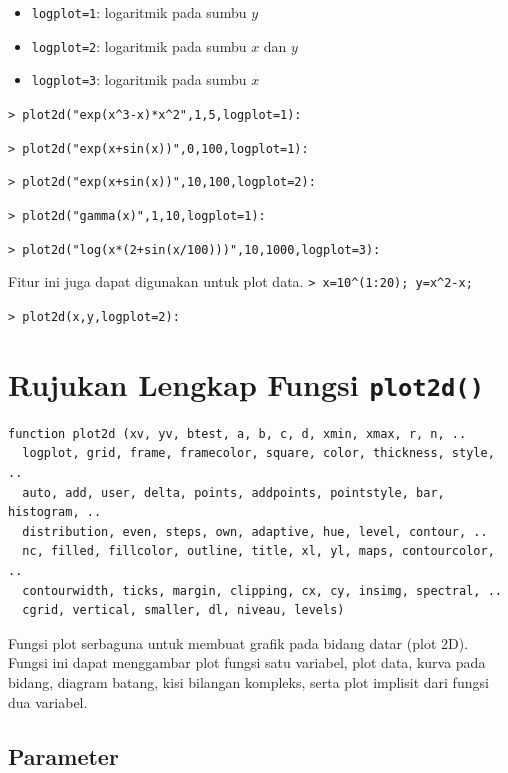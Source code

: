 \documentclass[11pt, a4paper]{article}
\newcommand{\emtcmd}[1]{\noindent\texttt{\textcolor{emtcommand}{>}\ #1}\par\smallskip}
\begin{document}
\begin{itemize}
    \item \texttt{logplot=1}: logaritmik pada sumbu $y$
    \item \texttt{logplot=2}: logaritmik pada sumbu $x$ dan $y$
    \item \texttt{logplot=3}: logaritmik pada sumbu $x$
\end{itemize}

\emtcmd{plot2d("exp(x\^{}3-x)*x\^{}2",1,5,logplot=1):}
\emtcmd{plot2d("exp(x+sin(x))",0,100,logplot=1):}
\emtcmd{plot2d("exp(x+sin(x))",10,100,logplot=2):}
\emtcmd{plot2d("gamma(x)",1,10,logplot=1):}
\emtcmd{plot2d("log(x*(2+sin(x/100)))",10,1000,logplot=3):}

Fitur ini juga dapat digunakan untuk plot data.
\emtcmd{x=10\^{}(1:20); y=x\^{}2-x;}
\emtcmd{plot2d(x,y,logplot=2):}

\section*{Rujukan Lengkap Fungsi \texttt{plot2d()}}

\begin{verbatim}
function plot2d (xv, yv, btest, a, b, c, d, xmin, xmax, r, n, ..
  logplot, grid, frame, framecolor, square, color, thickness, style, ..
  auto, add, user, delta, points, addpoints, pointstyle, bar, histogram, ..
  distribution, even, steps, own, adaptive, hue, level, contour, ..
  nc, filled, fillcolor, outline, title, xl, yl, maps, contourcolor, ..
  contourwidth, ticks, margin, clipping, cx, cy, insimg, spectral, ..
  cgrid, vertical, smaller, dl, niveau, levels)
\end{verbatim}

Fungsi plot serbaguna untuk membuat grafik pada bidang datar (plot 2D). Fungsi ini dapat menggambar plot fungsi satu variabel, plot data, kurva pada bidang, diagram batang, kisi bilangan kompleks, serta plot implisit dari fungsi dua variabel.

\subsection*{Parameter}
\end{document}
